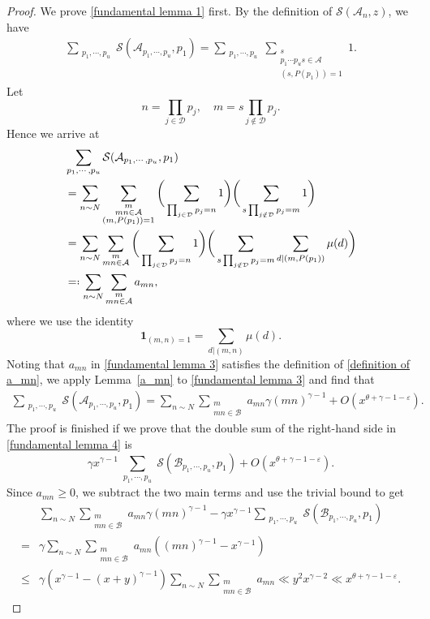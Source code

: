 \documentclass[10pt,a4paper]{amsart}
\newcommand{\cA}{\ensuremath{\mathcal{A}}}
\newcommand{\cB}{\ensuremath{\mathcal{B}}}
\newcommand{\cD}{\ensuremath{\mathcal{D}}}
\newcommand{\cS}{\ensuremath{\mathcal{S}}}
\newcommand*{\eqdef}{=\mathrel{\vcenter{\baselineskip0.5ex \lineskiplimit0pt
			\hbox{\scriptsize.}\hbox{\scriptsize.}}}%
}
\begin{document}
\begin{proof}
We prove \eqref{fundamental lemma 1} first. By the definition of $\cS(\cA_n,z)$, we have
\begin{align*}
\sum_{\substack{p_1 , \cdots , p_u}} \cS(\cA_{p_1, \cdots, p_u}, p_1) = \sum_{\substack{p_1 , \cdots , p_u}} \sum_{\substack{s \\ p_1\cdots p_u s \in \cA \\ (s, P(p_1))=1}} 1.
\end{align*}
Let 
$$
n = \prod_{j\in \cD} p_j, \quad m = s\prod_{j \notin \cD} p_j.
$$
Hence we arrive at
\begin{align} \label{fundamental lemma 3}
\nonumber
&\sum_{\substack{p_1 , \cdots , p_u}} \cS(\cA_{p_1, \cdots, p_u}, p_1) \\
\nonumber
& = \sum_{n \sim N} \sum_{\substack{m \\ mn \in \cA \\ (m,P(p_1)) = 1}} \bigg( \sum_{\substack{\prod_{j\in \cD} p_j = n}} 1 \bigg) \bigg( \sum_{ s\prod_{j \notin \cD} p_j = m} 1 \bigg) \\
\nonumber
& = \sum_{n \sim N} \sum_{\substack{m \\ mn \in \cA }} \bigg( \sum_{\substack{\prod_{j\in \cD} p_j = n}} 1 \bigg) \bigg( \sum_{ s\prod_{j \notin \cD} p_j = m} \sum_{d|(m,P(p_1))} \mu(d) \bigg)\\
& \eqdef \sum_{n \sim N} \sum_{\substack{m \\ mn \in \cA }} a_{mn},
\end{align}
where we use the identity
$$
\textbf{1}_{(m,n)=1} = \sum_{d|(m,n)} \mu(d) .
$$
Noting that $a_{mn}$ in \eqref{fundamental lemma 3} satisfies the definition of \eqref{definition of a_mn}, we apply Lemma~\ref{a_mn} to \eqref{fundamental lemma 3} and find that
\begin{align}\label{fundamental lemma 4}
\sum_{\substack{p_1 , \cdots , p_u}} \cS(\cA_{p_1, \cdots, p_u}, p_1) = \sum_{n \sim N} \sum_{\substack{m \\ mn \in \cB}} a_{mn} \gamma(mn)^{\gamma-1} + O(x^{\theta + \gamma - 1 -\varepsilon}).
\end{align} 
The proof is finished if we prove that the double sum of the right-hand side in \eqref{fundamental lemma 4} is
$$
\gamma x^{\gamma-1} \sum_{\substack{p_1 , \cdots , p_u}} \cS(\cB_{p_1, \cdots, p_u}, p_1) + O(x^{\theta + \gamma - 1 - \varepsilon}).
$$ 
Since $a_{mn} \geqslant 0$, we subtract the two main terms and use the trivial bound to get
\begin{align*}
\nonumber
&\sum_{n \sim N} \sum_{\substack{m \\ mn \in \cB}} a_{mn} \gamma(mn)^{\gamma-1} - \gamma x^{\gamma-1} \sum_{\substack{p_1 , \cdots , p_u}} \cS(\cB_{p_1, \cdots, p_u}, p_1) \\ 
\nonumber
=&\gamma \sum_{n \sim N} \sum_{\substack{m \\ mn \in \cB}} a_{mn} ((mn)^{\gamma-1}-x^{\gamma-1}) \\
\leqslant&  \gamma ( x^{\gamma-1} - (x+y)^{\gamma-1})\sum_{n \sim N} \sum_{\substack{m \\ mn \in \cB}} a_{mn} \ll y^2x^{\gamma-2} \ll x^{\theta +\gamma -1 - \varepsilon}.
\end{align*} 


\end{proof}
\end{document}
